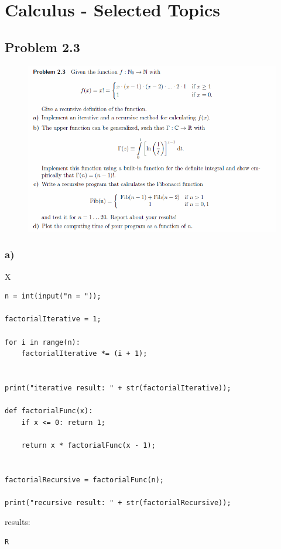 \section{Calculus - Selected Topics}


\subsection{Problem 2.3}


\begin{figure}[!ht]
\includegraphics[width=1\textwidth]{chapters/images/desc-2-3}
\end{figure}


\subsubsection{a)}

X
\begin{lstlisting}[caption=todo]
n = int(input("n = "));

factorialIterative = 1;

for i in range(n):
    factorialIterative *= (i + 1);


print("iterative result: " + str(factorialIterative));

def factorialFunc(x):
    if x <= 0: return 1;
	
    return x * factorialFunc(x - 1);


factorialRecursive = factorialFunc(n);

print("recursive result: " + str(factorialRecursive));
\end{lstlisting}

results:

\begin{lstlisting}[caption=Result of 1.1 a), keywordstyle=\color{black}]
R
\end{lstlisting}

